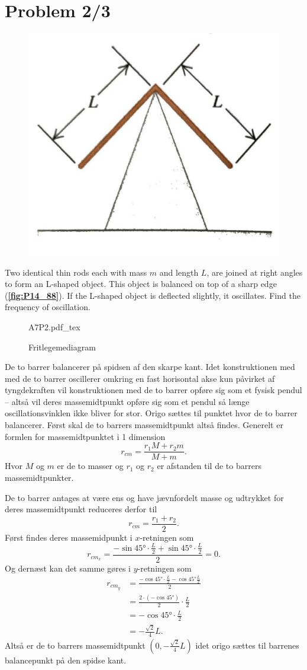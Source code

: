 \documentclass[12pt]{article}
\newcommand{\incfig}[2][1]{%
  \def\svgwidth{#1\columnwidth}
  {#2.pdf_tex}
}
\theoremstyle{definition}
\begin{document}
\section*{Problem 2/3}
\begin{figure} [ht]
  \centering
  \caption{}
  \includegraphics[width=0.5\linewidth]{../figures/P14_88.png}
  \label{fig:P14_88}
\end{figure}
Two identical thin rods each with mass $m$ and length $L$, are joined at right angles to form an L-shaped object. This object is balanced on top of a sharp edge (\textbf{\autoref{fig:P14_88}}). If the L-shaped object is deflected slightly, it oscillates. Find the frequency of oscillation.

\begin{figure}[ht]
  \centering
  \incfig[0.6]{A7P2}
  \caption{Fritlegemediagram}
  \label{fig:A7P2}
\end{figure}
\bigbreak
De to barrer balancerer på spidsen af den skarpe kant. Idet konstruktionen med med de to barrer oscillerer omkring en fast horisontal akse kun påvirket af tyngdekraften vil konstruktionen med de to barrer opføre sig som et fysisk pendul -- altså vil deres massemidtpunkt opføre sig som et pendul så længe oscillationsvinklen ikke bliver for stor. Origo sættes til punktet hvor de to barrer balancerer. Først skal de to barrers massemidtpunkt altså findes. Generelt er formlen for massemidtpunktet i 1 dimension
\[ 
r_{cm} = \frac{r_1M + r_2m}{M+m}
.\]
Hvor $M$ og $m$ er de to masser og $r_1$ og $r_2$ er afstanden til de to barrers massemidtpunkter.

De to barrer antages at være ens og have jævnfordelt masse og udtrykket for deres massemidtpunkt reduceres derfor til
\[ 
r_{cm} = \frac{r_1 + r_2}{2}
.\]
Først findes deres massemidpunkt i $x$-retningen som
\[ 
r_{cm_{x}} = \frac{-\sin \ang{45} \cdot \frac{L}{2} + \sin \ang{45} \cdot \frac{L}{2}}{2} = 0
.\]
Og dernæst kan det samme gøres i $y$-retningen som
\begin{align*}
  r_{cm_{y}} &= \frac{-\cos \ang{45} \cdot \frac{L}{2} - \cos \ang{45} \frac{L}{2}}{2} \\
  &= \frac{2 \cdot (- \cos \ang{45})}{2} \cdot \frac{L}{2} \\
  &= -\cos \ang{45} \cdot \frac{L}{2} \\
  &= - \frac{\sqrt{2}}{4} L
.\end{align*} 
Altså er de to barrers massemidtpunkt $\left( 0, -\frac{\sqrt{2}}{4}L \right)$ idet origo sættes til barrenes balancepunkt på den spidse kant. 
\end{document}
